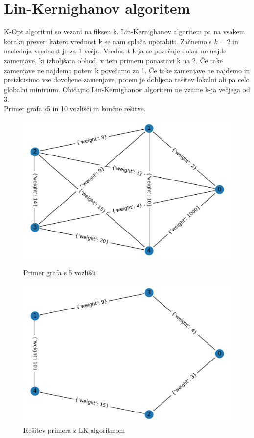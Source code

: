 \documentclass[12pt, a4paper]{article}
\begin{document}
\newpage
\section[Lin-Kernighanov algoritem]{Lin-Kernighanov algoritem}
K-Opt algoritmi so vezani na fiksen k. Lin-Kernighanov algoritem pa na vsakem koraku preveri katero vrednost k se nam splača uporabiti. Začnemo s $k=2$ in naslednja vrednost je za 1 večja. Vrednost k-ja se povečuje doker ne najde zamenjave, ki izboljšata obhod, v tem primeru ponastavi  k na 2. Če take zamenjave ne najdemo potem k povečamo za 1. Če take zamenjave ne najdemo in preizkusimo vse dovoljene zamenjave, potem je dobljena rešitev lokalni ali pa celo globalni minimum.  Običajno Lin-Kernighanov algoritem ne vzame k-ja večjega od 3.\\

Primer grafa s5 in 10 vozlišči in končne rešitve.

\begin{figure}[!h]
    
    \begin{minipage}{0.5\textwidth}
    \includegraphics[width=7 cm]{primeri/primer1.png}
    \caption{Primer grafa s 5 vozlišči}
    \label{primer_LK}
  \end{minipage}
 \hspace{1cm}
  \begin{minipage}{0.5\textwidth}
    \includegraphics[width=7 cm]{primeri/primer1_lk.png}
    \caption{Rešitev primera z LK algoritmom}
    \label{resitev_LK}
  \end{minipage}
    
\end{figure}
\end{document}
